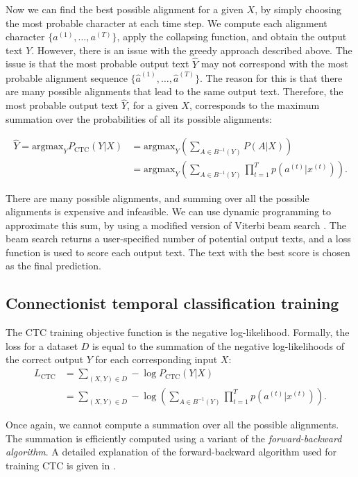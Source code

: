 Now we can find the best possible alignment for a given $X$, by simply choosing the most probable character at each time step.
We compute each alignment character $\{a^{(1)}, \dots, a^{(T)}\}$, apply the collapsing function, and obtain the output text $Y$.
However, there is an issue with the greedy approach described above. 
The issue is that the most probable output text $\hat{Y}$ may not correspond
with the most probable alignment sequence $\{\hat{a}^{(1)}, \dots, \hat{a}^{(T)}\}$.
The reason for this is that there are many possible alignments that lead to the same
output text. Therefore, the most probable output text $\hat{Y}$, for a given $X$, corresponds to the maximum summation over the probabilities of all its
possible alignments:

\begin{align}
    \hat{Y} = \text{argmax}_Y P_{\text{CTC}}(Y|X) &= \text{argmax}_Y \left(\sum\limits_{A \in B^{-1}(Y)} P(A|X)\right) \\
                                                               &= \text{argmax}_Y \left(\sum\limits_{A \in B^{-1}(Y)} \prod\limits_{t=1}^{T} p(a^{(t)} | x^{(t)})\right).
\end{align}

There are many possible alignments, and summing over all the possible alignments is expensive and infeasible.
We can use dynamic programming to approximate this sum, by using a modified version of Viterbi beam search \cite{hannun2017sequence}. 
The beam search returns a user-specified number of potential output texts, 
and a loss function is used to score each output text.
The text with the best score is chosen as the final prediction.

\subsection{Connectionist temporal classification training}
The CTC training objective function is the negative log-likelihood.
Formally, the loss for a dataset $D$ is equal to the summation of the negative log-likelihoods 
of the correct output $Y$ for each corresponding input $X$:
\begin{align}
    L_{\text{CTC}} &= \sum_{(X,Y) \in D} -\log P_{\text{CTC}}(Y|X) \\
                    &= \sum_{(X,Y) \in D} -\log \left( \sum_{A \in B^{-1}(Y)} \prod_{t=1}^{T} p(a^{(t)} | x^{(t)}) \right).
\end{align}

Once again, we cannot compute a summation over all the possible alignments.
The summation is efficiently computed using a variant of the \emph{forward-backward algorithm}.
A detailed explanation of the forward-backward algorithm used for training CTC is given in \cite{hannun2017sequence}.

